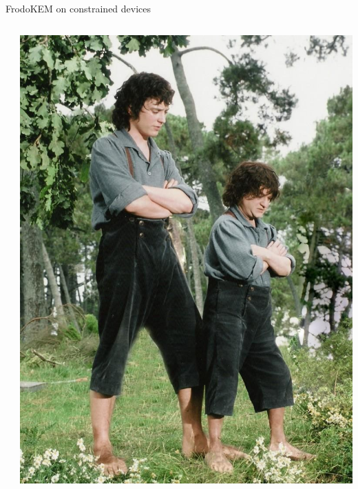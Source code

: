 \documentclass{beamer}            %
\begin{document}
\begin{frame}{FrodoKEM on constrained devices}
\begin{columns}
\begin{column}{0.7\textwidth}
\begin{itemize}
\end{itemize}
    \end{column}
    \begin{column}{0.3\textwidth}
        \includegraphics[scale=0.1]{frodo1}
    \end{column}
\end{columns}

\end{frame}

\end{document}
